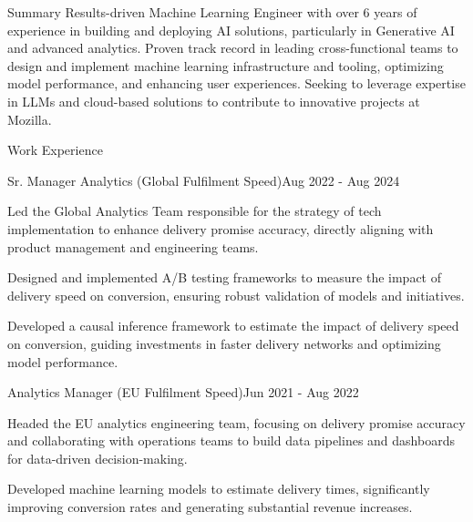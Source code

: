 \documentclass{resume} %
\begin{document}
\begin{rSection}{Summary}
    Results-driven Machine Learning Engineer with over 6 years of experience in building and deploying AI solutions, particularly in Generative AI and advanced analytics. Proven track record in leading cross-functional teams to design and implement machine learning infrastructure and tooling, optimizing model performance, and enhancing user experiences. Seeking to leverage expertise in LLMs and cloud-based solutions to contribute to innovative projects at Mozilla.
\end{rSection}

    \begin{rSection}{Work Experience}
                    \begin{rSubsection}
                {Sr. Manager Analytics (Global Fulfilment Speed)}{Aug 2022 - Aug 2024}
                {}
                {}
                                    \item Led the Global Analytics Team responsible for the strategy of tech implementation to enhance delivery promise accuracy, directly aligning with product management and engineering teams.
                                    \item Designed and implemented A/B testing frameworks to measure the impact of delivery speed on conversion, ensuring robust validation of models and initiatives.
                                    \item Developed a causal inference framework to estimate the impact of delivery speed on conversion, guiding investments in faster delivery networks and optimizing model performance.
                            \end{rSubsection}
                    \begin{rSubsection}
                {Analytics Manager (EU Fulfilment Speed)}{Jun 2021 - Aug 2022}
                {}
                {}
                                    \item Headed the EU analytics engineering team, focusing on delivery promise accuracy and collaborating with operations teams to build data pipelines and dashboards for data-driven decision-making.
                                    \item Developed machine learning models to estimate delivery times, significantly improving conversion rates and generating substantial revenue increases.

\end{rSubsection}
\end{rSection}
\end{document}
